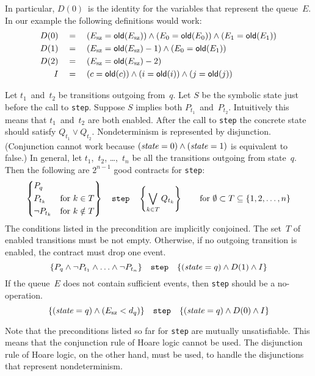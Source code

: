 \documentclass{article} %
\begin{document}
In particular, $D(0)$~is the identity for the variables that represent the queue~$E$.
In our example the following definitions would work:
{\def\=#1{(#1={\sf old}(#1))}
\begin{align*}
D(0) \quad&=\quad \={E_{\rm sz}}\land\={E_0}\land\={E_1} \\
D(1) \quad&=\quad (E_{\rm sz}={\sf old}(E_{\rm sz})-1)\land(E_0={\sf old}(E_1)) \\
D(2) \quad&=\quad (E_{\rm sz}={\sf old}(E_{\rm sz})-2) \\
I \quad&=\quad \=c\land\=i\land\=j
\end{align*}}

Let $t_1$~and~$t_2$ be transitions outgoing from~$q$.
Let $S$ be the symbolic state just before the call to {\tt step}.
Suppose $S$ implies both $P_{t_1}$~and~$P_{t_2}$.
Intuitively this means that $t_1$~and~$t_2$ are both enabled.
After the call to {\tt step} the concrete state should satisfy $Q_{t_1}\lor Q_{t_2}$.
Nondeterminism is represented by disjunction.
(Conjunction cannot work because $({\it state}=0)\land({\it state}=1)$ is equivalent to false.)
In general, let $t_1$,~$t_2$, \dots,~$t_n$ be all the transitions outgoing from state~$q$.
Then the following are $2^{n-1}$ good contracts for {\tt step}:
\[
  \left\{\begin{aligned}
  &P_q&&\\
  &P_{t_k}  &&\text{for $k\in T$} \\
  &\lnot P_{t_k}  &&\text{for $k\notin T$}
  \end{aligned}\right\}
  \quad\text{\tt step}\quad
  \left\{\bigvee_{k\in T}Q_{t_k}\right\}
  \qquad\text{for $\emptyset\subset T\subseteq \{1,2,\ldots,n\}$}
\]
The conditions listed in the precondition are implicitly conjoined.
The set~$T$ of enabled transitions must be not empty.
Otherwise, if no outgoing transition is enabled, the contract must drop one event.
\[
  \{P_q\land\lnot P_{t_1}\land\ldots\land\lnot P_{t_n}\}
  \quad\text{\tt step}\quad
  \{({\it state}=q)\land D(1)\land I\}
\]
If the queue~$E$ does not contain sufficient events, then {\tt step} should be a no-operation.
\[
  \{({\it state}=q)\land(E_{\rm sz}<d_q)\}
  \quad\text{\tt step}\quad
  \{({\it state}=q)\land D(0)\land I\}
\]

Note that the preconditions listed so far for {\tt step} are mutually unsatisfiable.
This means that the conjunction rule of Hoare logic cannot be used.
The disjunction rule of Hoare logic, on the other hand, must be used, to handle the disjunctions that represent nondeterminism.
\end{document}
